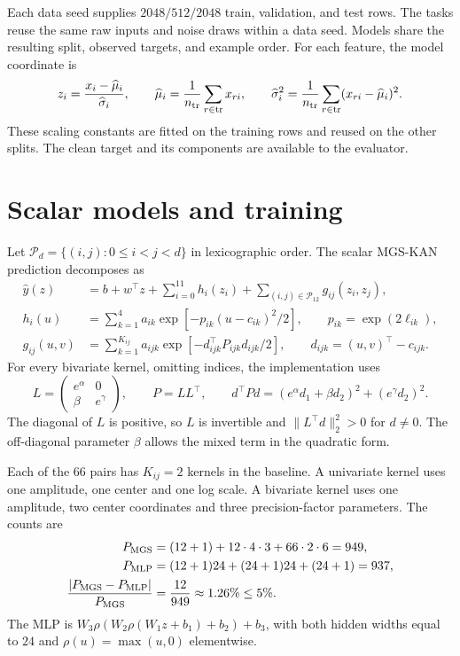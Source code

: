 \documentclass[11pt]{article}
\let\StudyMathSection\section
\newcommand{\norm}[1]{\lVert #1\rVert}
\newcommand{\setP}{\mathcal{P}}
\begin{document}
Each data seed supplies \(2048/512/2048\) train, validation, and test rows.
The tasks reuse the same raw inputs and noise draws within a data seed.
Models share the resulting split, observed targets, and example order.
For each feature, the model coordinate is
\[
 z_i=\frac{x_i-\widehat\mu_i}{\widehat\sigma_i},\qquad
 \widehat\mu_i=\frac{1}{n_{\rm tr}}\sum_{r\in{\rm tr}}x_{ri},\qquad
 \widehat\sigma_i^2=\frac{1}{n_{\rm tr}}\sum_{r\in{\rm tr}}
                    (x_{ri}-\widehat\mu_i)^2 .
\]
These scaling constants are fitted on the training rows and reused on the
other splits. The clean target and its components are available to the
evaluator.

\StudyMathSection{Scalar models and training}

Let \(\setP_d=\{(i,j):0\le i<j<d\}\) in lexicographic order.
The scalar MGS-KAN prediction decomposes as
\begin{align}
 \widehat y(z)
 &= b+w^\top z+\sum_{i=0}^{11}h_i(z_i)
      +\sum_{(i,j)\in\setP_{12}} g_{ij}(z_i,z_j),\label{eq:mgs}\\
 h_i(u)&=\sum_{k=1}^4 a_{ik}\exp[-p_{ik}(u-c_{ik})^2/2],
 \qquad p_{ik}=\exp(2\ell_{ik}),\nonumber\\
 g_{ij}(u,v)&=\sum_{k=1}^{K_{ij}} a_{ijk}
   \exp[-d_{ijk}^\top P_{ijk}d_{ijk}/2],
 \qquad d_{ijk}=(u,v)^\top-c_{ijk}.\nonumber
\end{align}
For every bivariate kernel, omitting indices, the implementation uses
\begin{equation}
 L=\begin{pmatrix}e^\alpha&0\\\beta&e^\gamma\end{pmatrix},
 \qquad P=LL^\top,\qquad
 d^\top P d=(e^\alpha d_1+\beta d_2)^2+(e^\gamma d_2)^2 .
 \label{eq:precision}
\end{equation}
The diagonal of \(L\) is positive, so \(L\) is invertible and
\(\norm{L^\top d}_2^2>0\) for \(d\ne 0\). The off-diagonal parameter
\(\beta\) allows the mixed term in the quadratic form.

Each of the \(66\) pairs has \(K_{ij}=2\) kernels in the baseline. A
univariate kernel uses one amplitude, one center and one log scale.
A bivariate kernel uses one amplitude, two center coordinates and three
precision-factor parameters. The counts are
\begin{align*}
 P_{\rm MGS}&=(12+1)+12\cdot4\cdot3+66\cdot2\cdot6=949,\\
 P_{\rm MLP}&=(12+1)24+(24+1)24+(24+1)=937,\\
 \frac{|P_{\rm MGS}-P_{\rm MLP}|}{P_{\rm MGS}}&=\frac{12}{949}
   \approx 1.26\% \le 5\%.
\end{align*}
The MLP is \(W_3\rho(W_2\rho(W_1z+b_1)+b_2)+b_3\), with both hidden widths
equal to \(24\) and \(\rho(u)=\max(u,0)\) elementwise.
\end{document}
